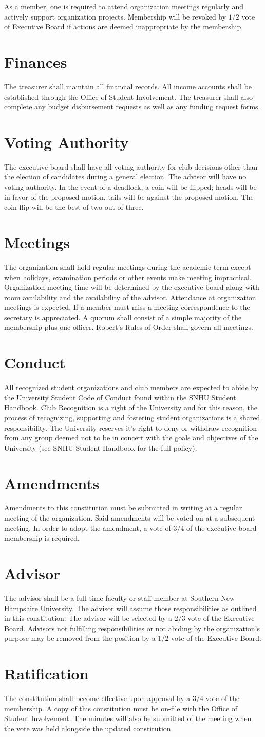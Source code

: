 \documentclass{article}
\newcommand{\article}[1]{\section{#1} \label{#1}}
\begin{document}
As a member, one is required to attend organization meetings regularly and actively support organization projects. Membership will be revoked by $1/2$ vote of Executive Board if actions are deemed inappropriate by the membership.

\article{Finances}
The treasurer shall maintain all financial records. All income accounts shall be established through the Office of Student Involvement. The treasurer shall also complete any budget disbursement requests as well as any funding request forms.

\article{Voting Authority}
The executive board shall have all voting authority for club decisions other than the election of candidates during a general election. The advisor will have no voting authority. In the event of a deadlock, a coin will be flipped; heads will be in favor of the proposed motion, tails will be against the proposed motion. The coin flip will be the best of two out of three.

\article{Meetings}
The organization shall hold regular meetings during the academic term except when holidays, examination periods or other events make meeting impractical. Organization meeting time will be determined by the executive board along with room availability and the availability of the advisor. Attendance at organization meetings is expected. If a member must miss a meeting correspondence to the secretary is appreciated. A quorum shall consist of a simple majority of the membership plus one officer. Robert's Rules of Order shall govern all meetings.

\article{Conduct}
All recognized student organizations and club members are expected to abide by the University Student Code of Conduct found within the SNHU Student Handbook. Club Recognition is a right of the University and for this reason, the process of recognizing, supporting and fostering student organizations is a shared responsibility. The University reserves it's right to deny or withdraw recognition from any group deemed not to be in concert with the goals and objectives of the University (see SNHU Student Handbook for the full policy).

\article{Amendments}
Amendments to this constitution must be submitted in writing at a regular meeting of the organization. Said amendments will be voted on at a subsequent meeting. In order to adopt the amendment, a vote of $3/4$ of the executive board membership is required.

\article{Advisor}
The advisor shall be a full time faculty or staff member at Southern New Hampshire University. The advisor will assume those responsibilities as outlined in this constitution. The advisor will be selected by a $2/3$ vote of the Executive Board. Advisors not fulfilling responsibilities or not abiding by the organization's purpose may be removed from the position by a $1/2$ vote of the Executive Board.

\article{Ratification}
The constitution shall become effective upon approval by a $3/4$ vote of the membership. A copy of this constitution must be on-file with the Office of Student Involvement. The minutes will also be submitted of the meeting when the vote was held alongside the updated constitution.
\end{document}
